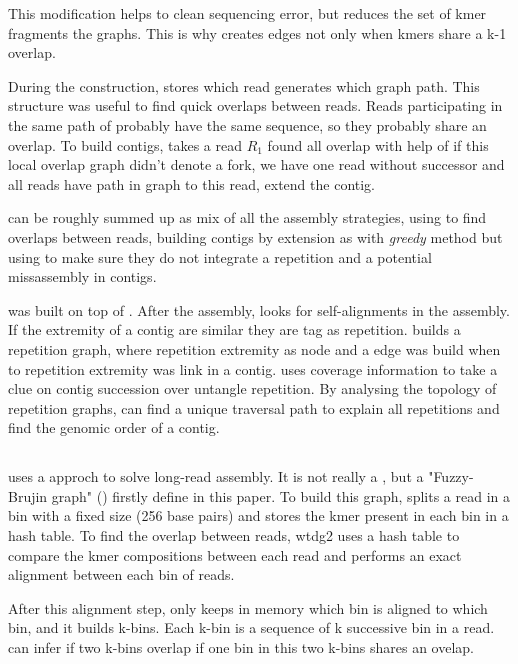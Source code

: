 \documentclass[main]{subfiles}
\begin{document}
This modification helps to clean sequencing error, but reduces the set of kmer fragments the \DBG graphs. This is why  creates edges not only when kmers share a k-1 overlap. 

During the  construction, \abruijn stores which read generates which graph path. This structure was useful to find quick overlaps between reads. Reads participating in the same path of  probably have the same sequence, so they probably share an overlap. To build contigs, \abruijn takes a read $R_1$ found all overlap with help of  if this local overlap graph didn't denote a fork, we have one read without successor and all reads have path in graph to this read, \abruijn extend the contig.

\abruijn can be roughly summed up as mix of all the assembly strategies, using \DBG to find overlaps between reads, building contigs by extension as with \textit{greedy} method but using \OLC to make sure they do not integrate a repetition and a potential missassembly in contigs.

\flye was built on top of \abruijn. After the \abruijn assembly, \flye looks for self-alignments in the assembly. If the extremity of a contig are similar they are tag as repetition. \flye builds a repetition graph, where repetition extremity as node and a edge was build when to repetition extremity was link in a contig. \flye uses coverage information to take a clue on contig succession over untangle repetition. By analysing the topology of repetition graphs, \flye can find a unique traversal path to explain all repetitions and find the genomic order of a contig.

\subsection{\wtdbg}

\wtdbg \cite{wtdbg2}  uses a \DBG approch to solve long-read assembly. It is not really a \DBG, but a "Fuzzy-Brujin graph" () firstly define in this paper. To build this graph, \wtdbg splits a read in a bin with a fixed size (256 base pairs) and stores the kmer present in each bin in a hash table.
To find the overlap between reads, wtdg2 uses a hash table to compare the kmer compositions between each read and performs an exact alignment between each bin of reads.

After this alignment step, \wtdbg only keeps in memory which bin is aligned to which bin, and it builds k-bins. Each k-bin is a sequence of k successive bin in a read. \wtdbg can infer if two k-bins overlap if one bin in this two k-bins shares an ovelap.
\end{document}

